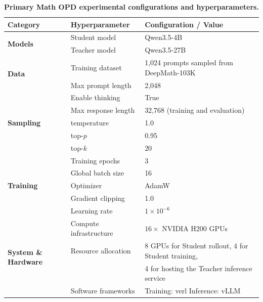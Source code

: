 \begin{table}[t]
\caption{\textbf{Primary Math OPD experimental configurations and hyperparameters.}}
\label{tab:opd-hyperparameters}
\centering
\small
\renewcommand{\arraystretch}{1.18}
\setlength{\tabcolsep}{6pt}
\begin{tabular}{@{}lll@{}}
\toprule
\textbf{Category} & \textbf{Hyperparameter} & \textbf{Configuration / Value} \\
\midrule

\multirow{2}{*}{\textbf{Models}}
& Student model & Qwen3.5-4B \\
& Teacher model & Qwen3.5-27B \\
\midrule

\multirow{2}{*}{\textbf{Data}}
& Training dataset & 1{,}024 prompts sampled from DeepMath-103K \\
& Max prompt length & 2{,}048 \\
\midrule

\multirow{5}{*}{\textbf{Sampling}}
& Enable thinking & True \\
& Max response length & 32{,}768 (training and evaluation) \\
& temperature & 1.0 \\
& top-$p$ & 0.95 \\
& top-$k$ & 20 \\
\midrule

\multirow{5}{*}{\textbf{Training}}
& Training epochs & 3 \\
& Global batch size & 16 \\
& Optimizer & AdamW \\
& Gradient clipping & 1.0 \\
& Learning rate & $1\times10^{-6}$ \\
\midrule

\multirow{4}{*}{\textbf{System \& Hardware}}
& Compute infrastructure & $16\times$ NVIDIA H200 GPUs \\
& Resource allocation & 8 GPUs for Student rollout, 4 for Student training, \\
& & 4 for hosting the Teacher inference service \\
& Software frameworks & Training: verl \quad Inference: vLLM \\
\bottomrule
\end{tabular}
\end{table}

